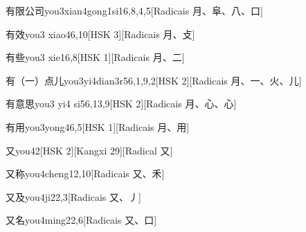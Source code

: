 \begin{entry}{有限公司}{you3xian4gong1si1}{6,8,4,5}[Radicais ⽉、⾩、⼋、⼝]
\end{entry}

\begin{entry}{有效}{you3 xiao4}{6,10}[HSK 3][Radicais ⽉、⽁]
\end{entry}

\begin{entry}{有些}{you3 xie1}{6,8}[HSK 1][Radicais ⽉、⼆]
\end{entry}

\begin{entry}{有（一）点儿}{you3yi4dian3r5}{6,1,9,2}[HSK 2][Radicais ⽉、⼀、⽕、⼉]
\end{entry}

\begin{entry}{有意思}{you3 yi4 si5}{6,13,9}[HSK 2][Radicais ⽉、⼼、⼼]
\end{entry}

\begin{entry}{有用}{you3yong4}{6,5}[HSK 1][Radicais ⽉、⽤]
\end{entry}

\begin{entry}{又}{you4}{2}[HSK 2][Kangxi 29][Radical ⼜]
\end{entry}

\begin{entry}{又称}{you4cheng1}{2,10}[Radicais ⼜、⽲]
\end{entry}

\begin{entry}{又及}{you4ji2}{2,3}[Radicais ⼜、⼃]
\end{entry}

\begin{entry}{又名}{you4ming2}{2,6}[Radicais ⼜、⼝]
\end{entry}

